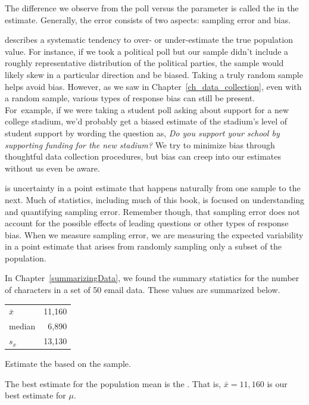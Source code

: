 \D{\newpage}

The difference we observe from the poll versus
the parameter is called the  in the estimate.  Generally, the error consists of two aspects:
sampling error and bias.

 describes a systematic tendency
to over- or under-estimate the true population value.
 For instance, if we took a political poll but our sample
  didn't include a roughly representative distribution of
  the political parties, the sample would likely skew
  in a particular direction and be biased.  Taking a truly random sample helps avoid bias.  However, as we saw in Chapter~\ref{ch_data_collection}, even with a random sample, various types of response bias can still be present.  For~example, if we were taking a student poll asking
about support for a new college stadium, we'd probably
get a biased estimate of the stadium's level of student
support by wording the question as,
\emph{Do you support your school by supporting funding
  for the new stadium?}
We try to minimize bias through thoughtful data
collection procedures, but bias can creep into our estimates without us even be aware.

 is uncertainty in a point estimate that happens naturally from one sample to the next. Much of statistics, including much of this book, is focused on understanding and quantifying sampling error.  Remember though, that sampling error does not account for the possible effects of leading questions or other types of response bias.  When we measure sampling error, we are measuring the expected variability in a point estimate that arises from randomly sampling only a subset of the population.


\begin{examplewrap}
\begin{nexample}{
In Chapter~\ref{summarizingData}, we found the summary statistics for the number of characters in a set of 50 email data. These values are summarized below.

\begin{tabular}{l r }
$\bar{x}$ & 11,160 \\
median & 6,890 \\
$s_x$ & 13,130
\end{tabular}

Estimate the  based on the sample.}The best estimate for the population mean is the . That is,
$\bar{x} = 11,160$ is our best estimate for $\mu$.
\end{nexample}
\end{examplewrap}

